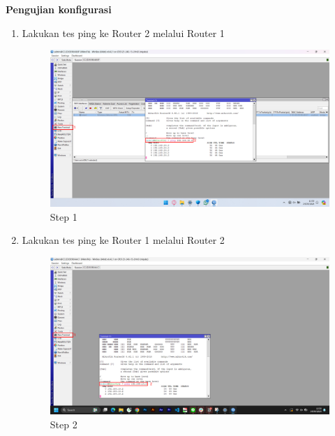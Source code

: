 \begin{center}
	\textbf{Pengujian konfigurasi}
	\begin{enumerate}
		\item Lakukan tes ping ke Router 2 melalui Router 1
		\begin{figure}[H]
			\centering
			\includegraphics[width=0.9\linewidth]{P2/img/per1/pc1/Step 4.png}
			\caption{Step 1}
			\label{fig:Ping Step 1(Per.1 PC1)}
		\end{figure}
		\item Lakukan tes ping ke Router 1 melalui Router 2
		\begin{figure}[H]
			\centering
			\includegraphics[width=0.9\linewidth]{P2/img/per1/pc2/Step 4.png}
			\caption{Step 2}
			\label{fig:Ping Step 2(Per.1 PC2)}
		\end{figure}
	\end{enumerate}
\end{center}

